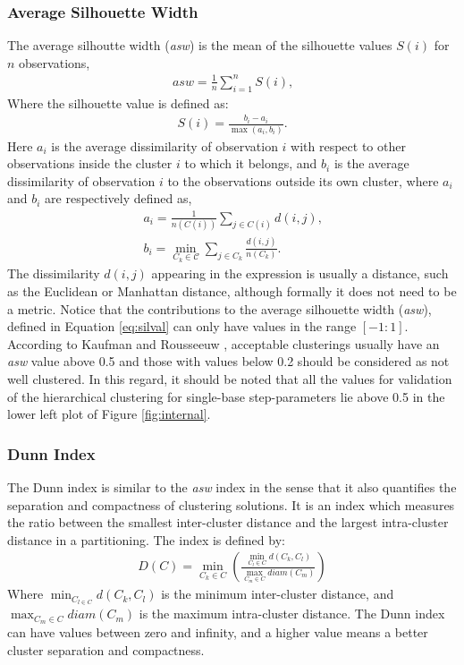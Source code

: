 \subsubsection{Average Silhouette Width}
The  average  silhoutte  width  (\textit{asw})  is  the  mean  of  the
silhouette values $S(i)$ for $n$ observations,
\begin{gather}
\textit{asw} = \frac{1}{n} \sum_{i=1}^{n} S(i) \text{,}
\end{gather}  
Where the silhouette value is defined as:
\begin{gather}
\label{eq:silval}  
S(i) = \frac{b_{i}-a_{i}}{\max(a_{i},b_{i})} \text{.}
\end{gather}
Here  $a_{i}$ is  the average  dissimilarity of  observation  $i$ with
respect  to other  observations inside  the  cluster $i$  to which  it
belongs, and  $b_{i}$ is the average dissimilarity  of observation $i$
to the observations outside its own cluster, where $a_i$ and $b_i$ are
respectively defined as,
\begin{gather}
a_{i} = \frac{1}{n(C(i))} \sum_{j \in C(i)} d(i,j) \text{,}\\
b_{i}     =    \min_{C_{k}     \in     \mathcal{C}}    \sum_{j     \in
  C_{k}}\frac{d(i,j)}{n(C_{k})} \text{.}
\end{gather}  
The dissimilarity  $d(i,j)$ appearing in  the expression is  usually a
distance,  such  as  the  Euclidean or  Manhattan  distance,  although
formally  it  does  not  need   to  be  a  metric.   Notice  that  the
contributions to the  average silhouette width (\textit{asw}), defined
in  Equation  \ref{eq:silval}  can  only  have  values  in  the  range
$[-1:1]$.   According  to  Kaufman and  Rousseeuw  \cite{kaufman1990},
acceptable clusterings  usually have  an \textit{asw} value  above 0.5
and  those with  values below  0.2 should  be considered  as  not well
clustered. In this regard, it should  be noted that all the values for
validation   of   the    hierarchical   clustering   for   single-base
step-parameters  lie  above 0.5  in  the  lower  left plot  of  Figure
\ref{fig:internal}.

\subsubsection{Dunn Index}
The Dunn index is similar to  the \textit{asw} index in the sense that
it  also  quantifies  the  separation and  compactness  of  clustering
solutions.  It  is an  index  which  measures  the ratio  between  the
smallest inter-cluster distance and the largest intra-cluster distance
in a partitioning.  The index is defined by:
\begin{gather}
D(C) = \min_{C_{k} \in C} \left(  \frac{\min_{C_{l} \in C}
  d(C_{k},C_{l})}{\max_{C_{m} \in C} diam(C_{m})} \right)
\end{gather}
Where $\min_{C_{l \in C}} d(C_{k},C_{l})$ is the minimum inter-cluster
distance,  and  $\max_{C_{m}  \in   C}  diam(C_{m})$  is  the  maximum
intra-cluster distance.   The Dunn index can have  values between zero
and infinity, and a higher value means a better cluster separation and
compactness.

